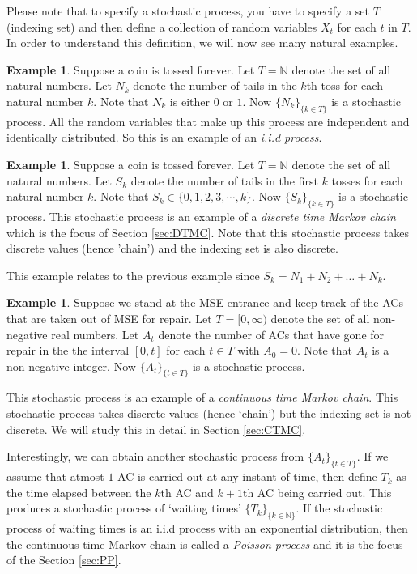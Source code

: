 \documentclass[letterpaper, 12pt]{article}
\newcommand{\1}{\mathds{1}} %
\theoremstyle{definition}
\newtheorem{example}[theorem]{Example}
\begin{document}
Please note that to specify a stochastic process, you have to specify a set $T$ (indexing set) and then define a collection of random variables $X_t$ for each $t$ in $T$. In order to understand this definition, we will now see many natural examples.

\begin{example}
\label{exmpl: simpleCointoss}
Suppose a coin is tossed forever. Let $T=\mathbb{N}$ denote the set of all natural numbers. Let $N_k$ denote the number of tails in the $k$th toss for each natural number $k$. Note that $N_k$ is either $0$ or $1$. Now $\{N_k\}_{\{k \in T\}}$ is a stochastic process.
All the random variables that make up this process are independent and identically distributed. So this is an example of an \emph{i.i.d process}.
\end{example}


\begin{example}
\label{exmpl: totalnumberoftailsCointoss}
Suppose a coin is tossed forever. Let $T=\mathbb{N}$ denote the set of all natural numbers. Let $S_k$ denote the number of tails in the first $k$ tosses for each natural number $k$. Note that $S_k \in \{0,1,2,3,\cdots,k\}$. Now $\{S_k\}_{\{k \in T\}}$ is a stochastic process.
This stochastic process is an example of a \emph{discrete time Markov chain} which is the focus of Section \ref{sec:DTMC}. Note that this stochastic process takes discrete values (hence 'chain') and the indexing set is also discrete.

This example relates to the previous example since $S_k = N_1 + N_2 + \ldots + N_k$.
\end{example}

\begin{example}
\label{exmpl:ACs}
Suppose we stand at the MSE entrance and keep track of the ACs that are taken out of MSE for repair. Let $T=[0,\infty)$ denote the set of all non-negative real numbers. Let $A_t$ denote the number of ACs that have gone for repair in the the interval $[0,t]$ for each $t \in T$ with $A_0=0$. Note that $A_t$ is a non-negative integer. Now $\{A_t\}_{\{t \in T\}}$ is a stochastic process. 

This stochastic process is an example of a \emph{continuous time Markov chain}. This stochastic process takes discrete values (hence `chain') but the indexing set is not discrete. We will study this in detail in Section \ref{sec:CTMC}.

Interestingly, we can obtain another stochastic process from $\{A_t\}_{\{t \in T\}}$. If we assume that atmost $1$ AC is carried out at any instant of time, then define $T_k$ as the time elapsed between the $k$th AC and $k+1$th AC being carried out. This produces a stochastic process of `waiting times'
$\{T_k\}_{\{k \in \mathbb{N}\}}$. If the stochastic process of waiting times is an i.i.d process with an exponential distribution, then the continuous time Markov chain is called a \emph{Poisson process} and it is the focus of the Section \ref{sec:PP}. 
\end{example}
\end{document}
